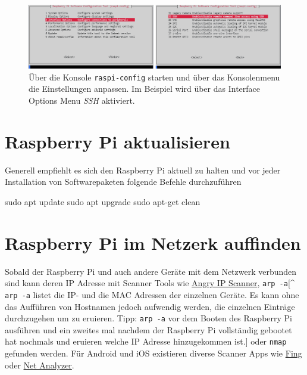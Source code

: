 \documentclass[
  11pt,
  a4paper,
  oneside, openany  ,captions=tableheading
]{scrbook}
\newenvironment{Shaded}{\begin{snugshade}}{\end{snugshade}}
\newcommand{\FunctionTok}[1]{\textcolor[rgb]{0.28,0.35,0.67}{#1}}
\newcommand{\NormalTok}[1]{\textcolor[rgb]{0.00,0.23,0.31}{#1}}
\theoremstyle{remark}
\begin{document}
\begin{figure}[H]

{\centering \includegraphics{images/raspberry_pi_enable_ssh.png}

}

\caption{Über die Konsole \texttt{raspi-config} starten und über das
Konsolenmenu die Einstellungen anpassen. Im Beispiel wird über das
Interface Options Menu \emph{SSH} aktiviert.}

\end{figure}%

\section{\texorpdfstring{Raspberry Pi
aktualisieren}{Raspberry Pi aktualisieren}}\label{raspberry-pi-aktualisieren}

Generell empfiehlt es sich den Raspberry Pi aktuell zu halten und vor
jeder Installation von Softwarepaketen folgende Befehle durchzuführen

\begin{Shaded}
\begin{Highlighting}[]
\FunctionTok{sudo}\NormalTok{ apt update}
\FunctionTok{sudo}\NormalTok{ apt upgrade}
\FunctionTok{sudo}\NormalTok{ apt{-}get clean}
\end{Highlighting}
\end{Shaded}

\section{Raspberry Pi im Netzerk
auffinden}\label{raspberry-pi-im-netzerk-auffinden}

Sobald der Raspberry Pi und auch andere Geräte mit dem Netzwerk
verbunden sind kann deren IP Adresse mit Scanner Tools wie
\href{https://angryip.org}{Angry IP Scanner}, \texttt{arp\ -a}{[}\^{}
\texttt{arp\ -a} listet die IP- und die MAC Adressen der einzelnen
Geräte. Es kann ohne das Aufführen von Hostnamen jedoch aufwendig
werden, die einzelnen Einträge durchzugehen um zu eruieren. Tipp:
\texttt{arp\ -a} vor dem Booten des Raspberry Pi ausführen und ein
zweites mal nachdem der Raspberry Pi vollständig gebootet hat nochmals
und eruieren welche IP Adresse hinzugekommen ist.{]} oder \texttt{nmap}
gefunden werden. Für Android und iOS existieren diverse Scanner Apps wie
\href{https://www.fing.com/products/fing-app}{Fing} oder
\href{https://techet.net/netanalyzer}{Net Analyzer}.
\end{document}
